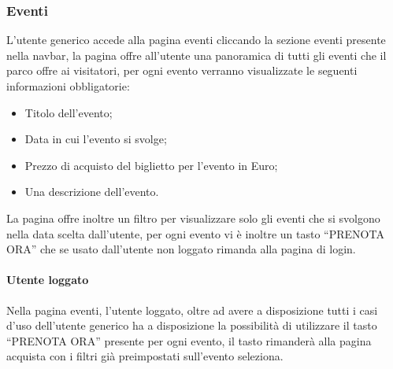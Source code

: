         \subsubsection{Eventi}
            L’utente generico accede alla pagina eventi cliccando la sezione eventi presente nella navbar, la pagina offre all’utente una panoramica di tutti gli eventi che il parco offre ai visitatori, per ogni evento verranno visualizzate le seguenti informazioni obbligatorie:
            \begin{itemize}
                \item Titolo dell’evento;
                \item Data in cui l’evento si svolge;
                \item Prezzo di acquisto del biglietto per l’evento in Euro;
                \item Una descrizione dell’evento.
            \end{itemize}
            La pagina offre inoltre un filtro per visualizzare solo gli eventi che si svolgono nella data scelta dall’utente, per ogni evento vi è inoltre un tasto “PRENOTA ORA” che se usato dall’utente non loggato rimanda alla pagina di login.
            \paragraph{Utente loggato} Nella pagina eventi, l’utente loggato, oltre ad avere a disposizione tutti i casi d’uso dell’utente generico ha a disposizione la possibilità di utilizzare il tasto “PRENOTA ORA” presente per ogni evento, il tasto rimanderà alla pagina acquista con i filtri già preimpostati sull’evento seleziona.
        
